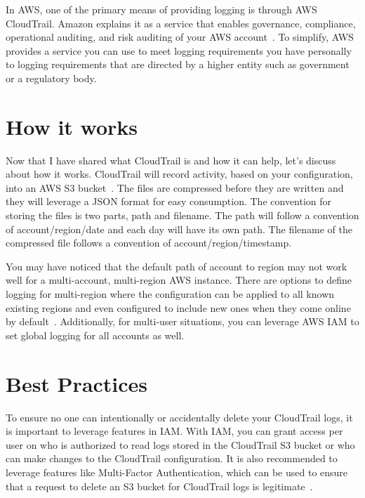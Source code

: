 In AWS, one of the primary means of providing logging is through AWS 
CloudTrail. Amazon explains it as a service that enables governance, 
compliance, operational auditing, and risk auditing of your AWS 
account~\cite{hid-sp18-518-CloudTrail-user-guide}. To simplify, AWS provides 
a service you can use to meet logging requirements you have personally to 
logging requirements that are directed by a higher entity such as government 
or a regulatory body.

\section{How it works}

Now that I have shared what CloudTrail is and how it can help, let’s discuss 
about how it works. CloudTrail will record activity, based on your 
configuration, into an AWS S3 bucket~\cite{hid-sp18-518-CloudTrail-log-example}.
The files are compressed before they are written and they will leverage a JSON 
format for easy consumption. The convention for storing the files is two 
parts, path and filename. The path will follow a convention of 
account/region/date and each day will have its own path.  The filename of the 
compressed file follows a convention of account/region/timestamp. 

You may have noticed that the default path of account to region may not work 
well for a multi-account, multi-region AWS instance. There are options to 
define logging for multi-region where the configuration can be applied to all 
known existing regions and even configured to include new ones when they come 
online by default~\cite{hid-sp18-518-CloudTrail-global-events}. Additionally, 
for multi-user situations, you can leverage AWS IAM to set global logging for 
all accounts as well.

\section{Best Practices}

To ensure no one can intentionally or accidentally delete your CloudTrail logs,
it is important to leverage features in IAM. With IAM, you can grant access 
per user on who is authorized to read logs stored in the CloudTrail S3 bucket 
or who can make changes to the CloudTrail configuration. It is also recommended 
to leverage features like Multi-Factor Authentication, which can be used to 
ensure that a request to delete an S3 bucket for CloudTrail logs is 
legitimate~\cite{hid-sp18-518-CloudTrail-user-guide}. 

